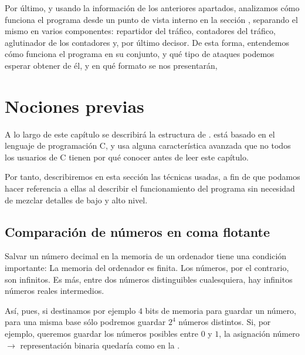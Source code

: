 Por último, y usando la información de los anteriores apartados, analizamos cómo funciona el programa desde un punto de 
vista interno en la sección , separando el mismo en varios componentes: repartidor del tráfico, 
contadores del tráfico, aglutinador de los contadores y, por último decisor. De esta forma, entendemos cómo funciona el 
programa en su conjunto, y qué tipo de ataques podemos esperar obtener de él, y en qué formato se nos presentarán, 

\section{Nociones previas}


A lo largo de este capítulo se describirá la estructura de \redborderddos. \redborderddos{} está basado en el lenguaje 
de programación C, y usa alguna característica avanzada que no todos los usuarios de C tienen por qué conocer antes de 
leer este capítulo.

Por tanto, describiremos en esta sección las técnicas usadas, a fin de que podamos hacer referencia a ellas al 
describir el funcionamiento del programa sin necesidad de mezclar detalles de bajo y alto nivel.

\subsection{Comparación de números en coma flotante}
Salvar un número decimal en la memoria de un ordenador tiene una condición importante: La memoria del ordenador es 
finita. Los números, por el contrario, son infinitos. Es más, entre dos números distinguibles cualesquiera, hay 
infinitos números reales intermedios.

Así, pues, si destinamos por ejemplo $4$ bits de memoria para guardar un número, para una misma base sólo podremos 
guardar $2^{4}$ números distintos. Si, por ejemplo, queremos guardar los números posibles entre $0$ y $1$, la 
asignación número $\rightarrow$ representación binaria quedaría como en la .


